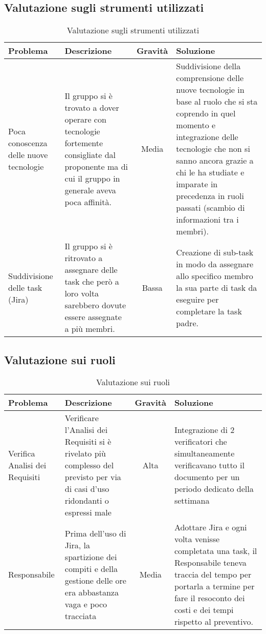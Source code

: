 \subsection{Valutazione sugli strumenti utilizzati}
\begin{table}[h]
\centering
\begin{tabular}{|p{3cm}|p{4cm}|c|p{5cm}|}
\hline
\rowcolor{gray!30}
\textbf{Problema} & \textbf{Descrizione} & \textbf{Gravità} & \textbf{Soluzione}\\
\hline
Poca conoscenza delle nuove tecnologie & 
Il gruppo si è trovato a dover operare con tecnologie fortemente consigliate dal proponente ma di cui il gruppo in generale aveva poca affinità. & 
Media & 
Suddivisione della comprensione delle nuove tecnologie in base al ruolo che si sta coprendo in quel momento e integrazione delle tecnologie che non si sanno ancora grazie a chi le ha studiate e imparate in precedenza in ruoli passati (scambio di informazioni tra i membri). \\
\hline
Suddivisione delle task (Jira) &
Il gruppo si è ritrovato a assegnare delle task che però a loro volta sarebbero dovute essere assegnate a più membri. &
Bassa &
Creazione di sub-task in modo da assegnare allo specifico membro la sua parte di task da eseguire per completare la task padre.\\
\hline
\end{tabular}
\caption{Valutazione sugli strumenti utilizzati }
\end{table}



\subsection{Valutazione sui ruoli}
\begin{table}[h]
\centering
\begin{tabular}{|p{3cm}|p{4cm}|c|p{5cm}|}
\hline
\rowcolor{gray!30}
\textbf{Problema} & \textbf{Descrizione} & \textbf{Gravità} & \textbf{Soluzione}\\
\hline
Verifica Analisi dei Requisiti &
Verificare l'Analisi dei Requisiti si è rivelato più complesso del previsto per via di casi d'uso ridondanti o espressi male &
Alta &
Integrazione di 2 verificatori che simultaneamente verificavano tutto il documento per un periodo dedicato della settimana
\\
\hline
Responsabile & 
Prima dell'uso di Jira, la spartizione dei compiti e della gestione delle ore era abbastanza vaga e poco tracciata &
Media &
Adottare Jira e ogni volta venisse completata una task, il Responsabile teneva traccia del tempo per portarla a termine per fare il resoconto dei costi e dei tempi rispetto al preventivo.
\\
\hline
\end{tabular}
\caption{Valutazione sui ruoli}
\end{table}
